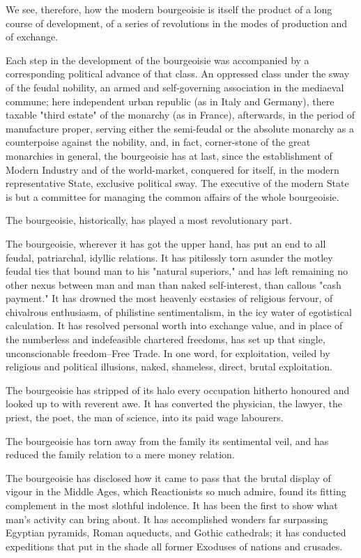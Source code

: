 \documentclass[11pt]{book}
\begin{document}
We see, therefore, how the modern bourgeoisie is itself the
product of a long course of development, of a series of
revolutions in the modes of production and of exchange.

Each step in the development of the bourgeoisie was accompanied
by a corresponding political advance of that class.  An
oppressed class under the sway of the feudal nobility, an
armed and self-governing association in the mediaeval commune;
here independent urban republic (as in Italy and Germany),
there taxable "third estate" of the monarchy (as in France),
afterwards, in the  period of manufacture proper, serving either
the semi-feudal or the absolute monarchy as a counterpoise
against the nobility, and, in fact, corner-stone of the great
monarchies in general, the bourgeoisie has at last, since the
establishment of Modern Industry and of the world-market,
conquered for itself, in the modern representative State,
exclusive political sway.  The executive of the modern State is
but a committee for managing the common affairs of the whole
bourgeoisie.

The bourgeoisie, historically, has played a most revolutionary
part.

The bourgeoisie, wherever it has got the upper hand, has put an
end to all feudal, patriarchal, idyllic relations.  It has
pitilessly torn asunder the motley feudal ties that bound man to
his "natural superiors," and has left remaining no other nexus
between man and man than naked self-interest, than callous "cash
payment."  It has drowned the most heavenly ecstasies of
religious fervour, of chivalrous enthusiasm, of philistine
sentimentalism, in the icy water of egotistical calculation.  It
has resolved personal worth into exchange value, and in place of
the numberless and indefeasible chartered freedoms, has set up that
single, unconscionable freedom--Free Trade.  In one word, for
exploitation, veiled by religious and political illusions, naked,
shameless, direct, brutal exploitation.

The bourgeoisie has stripped of its halo every occupation
hitherto honoured and looked up to with reverent awe.  It has
converted the physician, the lawyer, the priest, the poet, the
man of science, into its paid wage labourers.

The bourgeoisie has torn away from the family its sentimental
veil, and has reduced the family relation to a mere money
relation.

The bourgeoisie has disclosed how it came to pass that the
brutal display of vigour in the Middle Ages, which Reactionists
so much admire, found its fitting complement in the most slothful
indolence.  It has been the first to show what man's activity can
bring about.  It has accomplished wonders far surpassing Egyptian
pyramids, Roman aqueducts, and Gothic cathedrals; it has
conducted expeditions that put in the shade all former Exoduses
of nations and crusades.
\end{document}
